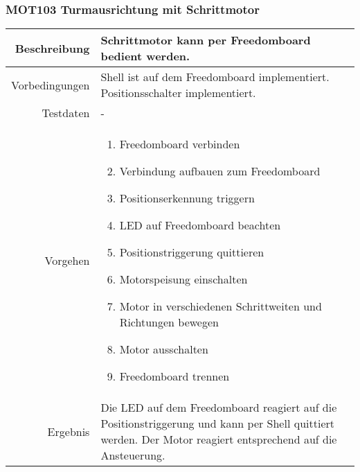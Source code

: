 \newpage
\subsubsection{MOT103 Turmausrichtung mit Schrittmotor}
\begin{table}[h!]
	\renewcommand{\arraystretch}{1.5}
	\begin{tabular}{|r|p{14cm}|}
		\hline Beschreibung	&
			Schrittmotor kann per Freedomboard bedient werden. \\ 
		\hline Vorbedingungen	&
			Shell ist auf dem Freedomboard implementiert.
			Positionsschalter implementiert. \\ 
		\hline Testdaten	& - \\ 
		\hline Vorgehen		& 
		\begin{enumerate}
			\item Freedomboard verbinden
			\item Verbindung aufbauen zum Freedomboard
			\item Positionserkennung triggern
			\item LED auf Freedomboard beachten
			\item Positionstriggerung quittieren
			\item Motorspeisung einschalten
			\item Motor in verschiedenen Schrittweiten und Richtungen bewegen
			\item Motor ausschalten
			\item Freedomboard trennen
		\end{enumerate} \\ 
		\hline Ergebnis 	&
			Die LED auf dem Freedomboard reagiert auf die
			Positionstriggerung und kann per Shell quittiert werden.
			Der Motor reagiert entsprechend auf die Ansteuerung. \\ 
		\hline 
	\end{tabular}
\end{table}

\newpage
